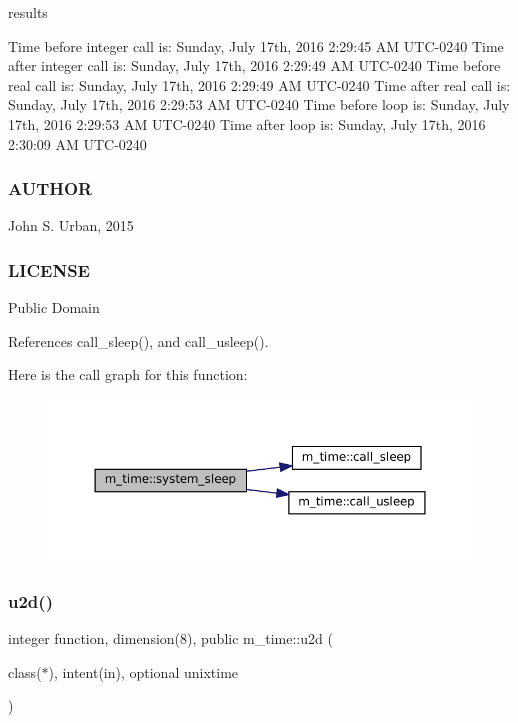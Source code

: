 results

Time before integer call is\+: Sunday, July 17th, 2016 2\+:29\+:45 AM U\+T\+C-\/0240 Time after integer call is\+: Sunday, July 17th, 2016 2\+:29\+:49 AM U\+T\+C-\/0240 Time before real call is\+: Sunday, July 17th, 2016 2\+:29\+:49 AM U\+T\+C-\/0240 Time after real call is\+: Sunday, July 17th, 2016 2\+:29\+:53 AM U\+T\+C-\/0240 Time before loop is\+: Sunday, July 17th, 2016 2\+:29\+:53 AM U\+T\+C-\/0240 Time after loop is\+: Sunday, July 17th, 2016 2\+:30\+:09 AM U\+T\+C-\/0240

\subsubsection*{A\+U\+T\+H\+OR}

John S. Urban, 2015

\subsubsection*{L\+I\+C\+E\+N\+SE}

Public Domain 

References call\+\_\+sleep(), and call\+\_\+usleep().

Here is the call graph for this function\+:\nopagebreak
\begin{figure}[H]
\begin{center}
\leavevmode
\includegraphics[width=350pt]{namespacem__time_a7c5d028ae1e1e01162ffc7bb55dcbbb1_cgraph}
\end{center}
\end{figure}
\mbox{\label{namespacem__time_a083bc231f8ba1879d7f86ab424e77d6c}} 
\subsubsection{\texorpdfstring{u2d()}{u2d()}}
{\footnotesize\ttfamily integer function, dimension(8), public m\+\_\+time\+::u2d (\begin{DoxyParamCaption}\item[{class($\ast$), intent(in), optional}]{unixtime }\end{DoxyParamCaption})}



